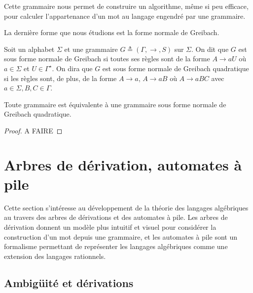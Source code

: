 \begin{remark}
  Cette grammaire nous permet de construire un algorithme, même si peu efficace,
  pour calculer l'appartenance d'un mot au langage engendré par une grammaire.
\end{remark}

La dernière forme que nous étudions est la forme normale de Greibach.

\begin{definition}
  Soit un alphabet $\Sigma$ et une grammaire $G \triangleq (\Gamma,\to,S)$ sur
  $\Sigma$.
  On dit que $G$ est sous forme normale de Greibach si toutes ses règles sont
  de la forme $A \to aU$ où $a \in \Sigma$ et $U \in \Gamma^\star$. On dira que
  $G$ est sous forme normale de Greibach quadratique si les règles sont, de
  plus, de la forme $A \to a$, $A \to aB$ où $A \to aBC$ avec
  $a\in\Sigma, B,C \in \Gamma$.
\end{definition}

\begin{proposition}
  Toute grammaire est équivalente à une grammaire sous forme normale de Greibach
  quadratique.
\end{proposition}

\begin{proof}
  A FAIRE
\end{proof}

\section{Arbres de dérivation, automates à pile}

Cette section s'intéresse au développement de la théorie des langages
algébriques au travers des arbres de dérivations et des automates à pile. Les
arbres de dérivation donnent un modèle plus intuitif et visuel pour considérer
la construction d'un mot depuis une grammaire, et les automates à pile sont un
formalisme permettant de représenter les langages algébriques comme une
extension des langages rationnels.

\subsection{Ambigüité et dérivations}

